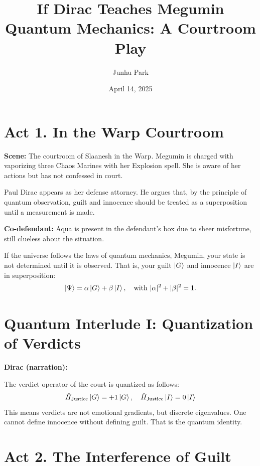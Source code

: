 \documentclass[12pt]{article}
\title{\textbf{If Dirac Teaches Megumin Quantum Mechanics: A Courtroom Play}}
\author{Junhu Park}
\date{April 14, 2025}
\begin{document}
\maketitle

\section*{Act 1. In the Warp Courtroom}

\textbf{Scene:} The courtroom of Slaanesh in the Warp\cite{SlaaneshWikipedia}.  
Megumin\cite{MeguminWikipedia} is charged with vaporizing three Chaos Marines with her Explosion spell.  
She is aware of her actions but has not confessed in court.

Paul Dirac\cite{DiracWikipedia} appears as her defense attorney.  
He argues that, by the principle of quantum observation\cite{neumann1955mathematical}, guilt and innocence should be treated as a superposition until a measurement is made.

\textbf{Co-defendant:}  
Aqua\cite{AquaWikipedia} is present in the defendant's box due to sheer misfortune, still clueless about the situation.

\begin{tcolorbox}[title=Dirac:]
If the universe follows the laws of quantum mechanics\cite{dirac1981principles,griffiths2018introduction}, Megumin, your state is not determined until it is observed. That is, your guilt $\ket{G}$ and innocence $\ket{I}$ are in superposition:
\[
\ket{\Psi} = \alpha \ket{G} + \beta \ket{I}, \quad \text{with } |\alpha|^2 + |\beta|^2 = 1.
\]
\end{tcolorbox}

\section*{Quantum Interlude I: Quantization of Verdicts}

\textbf{Dirac (narration):}

The verdict operator of the court is quantized\cite{nielsen2010quantum} as follows:
\[
\hat{H}_{\text{Justice}} \ket{G} = +1 \ket{G}, \quad \hat{H}_{\text{Justice}} \ket{I} = 0 \ket{I}
\]
This means verdicts are not emotional gradients, but discrete eigenvalues. One cannot define innocence without defining guilt. That is the quantum identity\cite{dirac1981principles}.

\section*{Act 2. The Interference of Guilt}
\end{document}
